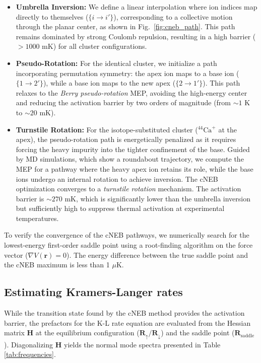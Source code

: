 \documentclass[aps,prl,twocolumn,superscriptaddress,showpacs,floatfix]{revtex4-2}
\begin{document}
\begin{itemize}

    \item \textbf{Umbrella Inversion:} We define a linear interpolation where ion indices map directly to themselves ($\{ i\rightarrow i'\}$), corresponding to a collective motion through the planar center, as shown in Fig.~\ref{fig:cneb_path}. This path remains dominated by strong Coulomb repulsion, resulting in a high barrier ($> 1000$ mK) for all cluster configurations.

    \item \textbf{Pseudo-Rotation:} For the identical cluster, we initialize a path incorporating permutation symmetry: the apex ion maps to a base ion ($\{ 1\rightarrow 2'\}$), while a base ion maps to the new apex ($\{ 2\rightarrow 1'\}$). This path relaxes to the \textit{Berry pseudo-rotation} MEP, avoiding the high-energy center and reducing the activation barrier by two orders of magnitude (from $\sim 1$ K to $\sim 20$ mK).

     \item \textbf{Turnstile Rotation:} For the isotope-substituted cluster ($^{44}\mathrm{Ca}^+$ at the apex), the pseudo-rotation path is energetically penalized as it requires forcing the heavy impurity into the tighter confinement of the base. Guided by MD simulations, which show a roundabout trajectory, we compute the MEP for a pathway where the heavy apex ion retains its role, while the base ions undergo an internal rotation to achieve inversion. The cNEB optimization converges to a \textit{turnstile rotation} mechanism. The activation barrier is $\sim 270$ mK, which is significantly lower than the umbrella inversion but sufficiently high to suppress thermal activation at experimental temperatures.

\end{itemize}

To verify the convergence of the cNEB pathways, we numerically search for the lowest-energy first-order saddle point using a root-finding algorithm on the force vector ($\nabla V(\mathbf{r}) = 0$). The energy difference between the true saddle point and the cNEB maximum is less than 1 $\mu$K.

\subsection{Estimating Kramers-Langer rates}

While the transition state found by the cNEB method provides the activation barrier, the prefactors for the K-L rate equation are evaluated from the Hessian matrix $\mathbf{H}$ at the equilibrium configuration ($\mathbf{R}_{\uparrow} / \mathbf{R}_{\downarrow}$) and the saddle point ($\mathbf{R}_{\text{saddle}}$). Diagonalizing $\mathbf{H}$ yields the normal mode spectra presented in Table \ref{tab:frequencies}.
\end{document}
